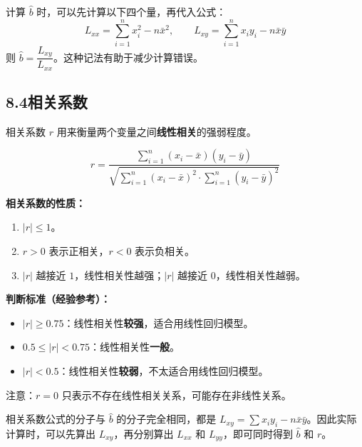 \documentclass[12pt, a4paper]{ctexart}
\begin{document}
\begin{warnbox}[计算技巧]
计算 $\hat{b}$ 时，可以先计算以下四个量，再代入公式：
\[
L_{xx} = \sum_{i=1}^{n}x_i^2 - n\bar{x}^2, \qquad L_{xy} = \sum_{i=1}^{n}x_iy_i - n\bar{x}\bar{y}
\]
则 $\hat{b} = \dfrac{L_{xy}}{L_{xx}}$。这种记法有助于减少计算错误。
\end{warnbox}

\subsection*{8.4\quad 相关系数}

\begin{knowledgebox}[相关系数 $r$]
相关系数 $r$ 用来衡量两个变量之间\textbf{线性相关}的强弱程度。

\[
\boxed{r = \frac{\displaystyle\sum_{i=1}^{n}(x_i - \bar{x})(y_i - \bar{y})}{\sqrt{\displaystyle\sum_{i=1}^{n}(x_i - \bar{x})^2 \cdot \sum_{i=1}^{n}(y_i - \bar{y})^2}}}
\]

\medskip
\textbf{相关系数的性质：}
\begin{enumerate}[leftmargin=2em]
  \item $|r| \leqslant 1$。
  \item $r > 0$ 表示正相关，$r < 0$ 表示负相关。
  \item $|r|$ 越接近 $1$，线性相关性越强；$|r|$ 越接近 $0$，线性相关性越弱。
\end{enumerate}

\medskip
\textbf{判断标准（经验参考）：}
\begin{itemize}[leftmargin=2em]
  \item $|r| \geqslant 0.75$：线性相关性\textbf{较强}，适合用线性回归模型。
  \item $0.5 \leqslant |r| < 0.75$：线性相关性\textbf{一般}。
  \item $|r| < 0.5$：线性相关性\textbf{较弱}，不太适合用线性回归模型。
\end{itemize}

\medskip
注意：$r = 0$ 只表示不存在线性相关关系，可能存在非线性关系。
\end{knowledgebox}

\begin{tipbox}[公式简化记忆]
相关系数公式的分子与 $\hat{b}$ 的分子完全相同，都是 $L_{xy} = \sum x_iy_i - n\bar{x}\bar{y}$。因此实际计算时，可以先算出 $L_{xy}$，再分别算出 $L_{xx}$ 和 $L_{yy}$，即可同时得到 $\hat{b}$ 和 $r$。
\end{tipbox}

\end{document}
